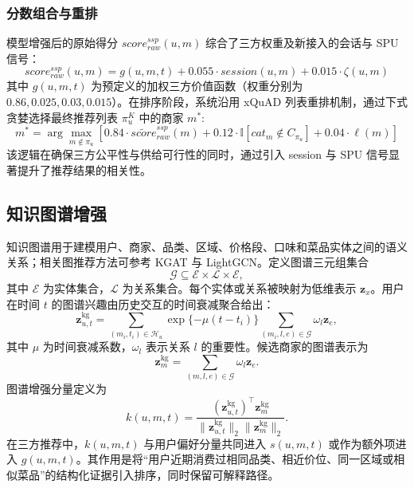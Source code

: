 \documentclass[12pt,a4paper]{article}
\begin{document}
    \subsubsection{分数组合与重排}
    模型增强后的原始得分 $score_{raw}^{ssp}(u,m)$ 综合了三方权重及新接入的会话与 SPU 信号：
    \begin{equation}
    	score_{raw}^{ssp}(u,m) = g(u,m,t) + 0.055 \cdot session(u,m) + 0.015 \cdot \zeta(u,m)
    \end{equation}
    其中 $g(u,m,t)$ 为预定义的加权三方价值函数（权重分别为 $0.86, 0.025, 0.03, 0.015$）。在排序阶段，系统沿用 xQuAD 列表重排机制，通过下式贪婪选择最终推荐列表 $\pi_u^K$ 中的商家 $m^*$:
    \begin{equation}
    	m^* = \arg\max_{m\notin \pi_u} \left[ 0.84\cdot\widetilde{score}_{raw}^{ssp}(m) + 0.12\cdot\mathbb{I}[cat_m \notin C_{\pi_u}] + 0.04\cdot \ell(m) \right]
    \end{equation}
    该逻辑在确保三方公平性与供给可行性的同时，通过引入 session 与 SPU 信号显著提升了推荐结果的相关性。

    \subsection{知识图谱增强}

    知识图谱用于建模用户、商家、品类、区域、价格段、口味和菜品实体之间的语义关系；相关图推荐方法可参考 KGAT 与 LightGCN\cite{wang2019kgat,he2020lightgcn}。定义图谱三元组集合
    \begin{equation}
        \mathcal{G}\subseteq \mathcal{E}\times\mathcal{L}\times\mathcal{E},
    \end{equation}
    其中 $\mathcal{E}$ 为实体集合，$\mathcal{L}$ 为关系集合。每个实体或关系被映射为低维表示 $\mathbf{z}_x$。用户在时间 $t$ 的图谱兴趣由历史交互的时间衰减聚合给出：
    \begin{equation}
        \mathbf{z}_{u,t}^{\mathrm{kg}}=\sum_{(m_i,t_i)\in\mathcal{H}_u}\exp\{-\mu(t-t_i)\}\sum_{(m_i,l,e)\in\mathcal{G}}\omega_l\mathbf{z}_e,
    \end{equation}
    其中 $\mu$ 为时间衰减系数，$\omega_l$ 表示关系 $l$ 的重要性。候选商家的图谱表示为
    \begin{equation}
        \mathbf{z}_{m}^{\mathrm{kg}}=\sum_{(m,l,e)\in\mathcal{G}}\omega_l\mathbf{z}_e.
    \end{equation}
    图谱增强分量定义为
    \begin{equation}
        k(u,m,t)=\frac{\left(\mathbf{z}_{u,t}^{\mathrm{kg}}\right)^{\top}\mathbf{z}_{m}^{\mathrm{kg}}}{\|\mathbf{z}_{u,t}^{\mathrm{kg}}\|_2\|\mathbf{z}_{m}^{\mathrm{kg}}\|_2}.
    \end{equation}
    在三方推荐中，$k(u,m,t)$ 与用户偏好分量共同进入 $s(u,m,t)$ 或作为额外项进入 $g(u,m,t)$。其作用是将“用户近期消费过相同品类、相近价位、同一区域或相似菜品”的结构化证据引入排序，同时保留可解释路径。
\end{document}
